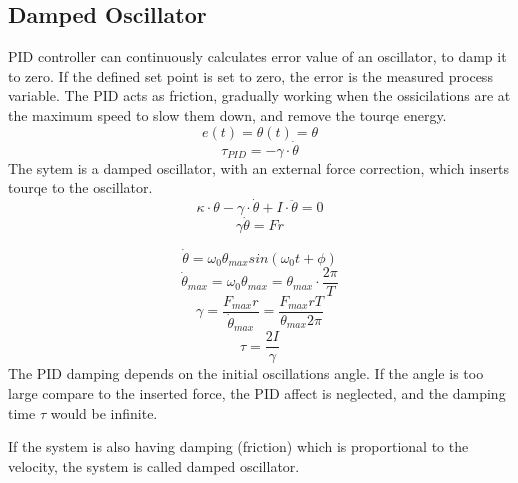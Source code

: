 \documentclass[\main/master.tex]{subfiles}
\begin{document}
\subsection{Damped Oscillator}
PID controller can continuously calculates error value of an oscillator, to damp it to zero. If the defined set point is set to zero, the error is the measured process variable. The PID acts as friction, gradually working when the ossicilations are at the maximum speed to slow them down, and remove the tourqe energy.
\begin{equation}
e(t) = \theta(t) = \theta   \label{eqn:error}
\end{equation}
\begin{equation}
\tau_{PID} = -\gamma\cdot\dot{\theta}   \label{eqn:friction_tourqe}
\end{equation}
The sytem is a damped oscillator, with an external force correction, which inserts tourqe to the oscillator.
\begin{equation}
\kappa\cdot\theta - \gamma\cdot\dot{\theta}  + I\cdot\ddot{\theta} = 0   \label{eqn:damped__pid_motion_equation}
\end{equation}
\begin{equation}
\gamma\dot{\theta}  = Fr   \label{eqn:damped__pid_motion_equation}
\end{equation}

\begin{equation}
\dot{\theta} = \omega_0\theta_{max}sin(\omega_0 t +\phi)    \label{eqn:undamped_motion_equation}
\end{equation}
\begin{equation}
\dot{\theta}_{max} = \omega_0\theta_{max} = \theta_{max}\cdot\frac{2\pi}{T}    \label{eqn:undamped_motion_equation}
\end{equation}
\begin{equation}
\gamma  = \frac{F_{max}r}{\dot{\theta}_{max}} =\frac{F_{max}rT}{\theta_{max}2\pi}    \label{eqn:damped_pid_motion_equation}
\end{equation}
\begin{equation}
\tau =  \frac{2I}{\gamma}  \label{eqn:damping_time}
\end{equation}
The PID damping depends on the initial oscillations angle. If the angle is too large compare to the inserted force, the PID affect is neglected, and the damping time $\tau$ would be infinite.
\par

\color{blue}

If the system is also having damping (friction) which is proportional to the velocity, the system is called damped oscillator.
\end{document}
